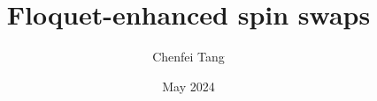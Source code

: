 \documentclass{article}
\begin{document}
\title{\textbf{Floquet-enhanced spin swaps}}
\author{Chenfei Tang}
\date{May 2024}
\maketitle
\end{document}
